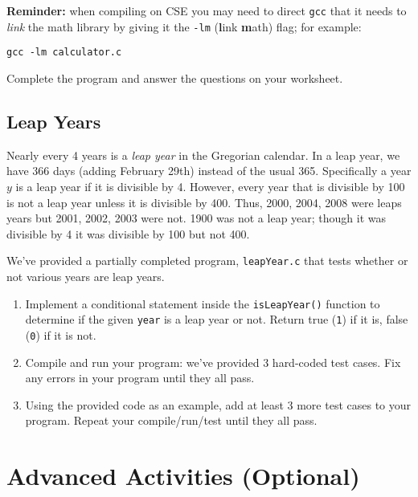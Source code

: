 \documentclass[12pt]{scrartcl}
\begin{document}
\textbf{Reminder:} when compiling on CSE you may need to direct \texttt{gcc}
that it needs to \emph{link} the math library by giving it the \texttt{-lm} 
(\textbf{l}ink \textbf{m}ath) flag; for example:

\texttt{gcc -lm calculator.c}

Complete the program and answer the questions on your worksheet.

\subsection{Leap Years}

Nearly every 4 years is a \emph{leap year} in the Gregorian calendar.
In a leap year, we have 366 days (adding February 29th) instead of the
usual 365.  Specifically a year $y$ is a leap year if it is divisible
by 4.  However, every year that is divisible by 100 is not a leap year 
unless it is divisible by 400.  Thus, 2000, 2004, 2008 were leaps years
but 2001, 2002, 2003 were not.  1900 was not a leap year; though it was
divisible by 4 it was divisible by 100 but not 400.

We've provided a partially completed program, \texttt{leapYear.c}
that tests whether or not various years are leap years.  

\begin{enumerate}
  \item Implement a conditional statement inside the 
  \texttt{isLeapYear()} function to determine if the given
  \texttt{year} is a leap year or not.  Return true (\texttt{1})
  if it is, false (\texttt{0}) if it is not.
  \item Compile and run your program: we've provided 3 
  hard-coded test cases.  Fix any errors in your program until they all pass.
  \item Using the provided code as an example, add at least 3 more
  test cases to your program.  Repeat your compile/run/test until they
  all pass.
\end{enumerate}


\section{Advanced Activities (Optional)}
\end{document}
